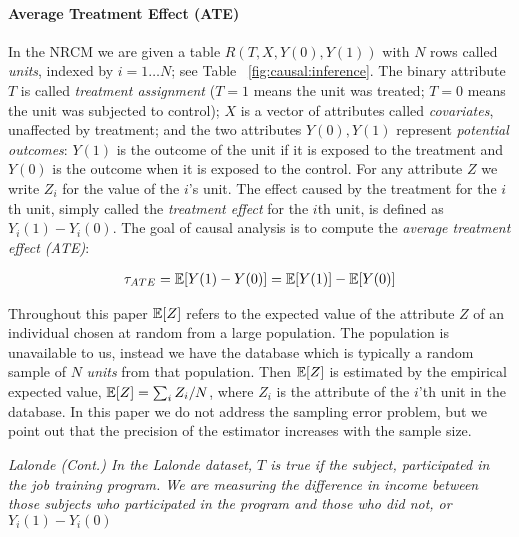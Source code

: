 \vspace{-.3cm}

\paragraph*{Average Treatment Effect (ATE)}
In the NRCM we are given a table $R(T,X,Y(0),Y(1))$ with $N$ rows called {\em units},
indexed by $i=1 \ldots N$; see Table~ \ref{fig:causal:inference}.
The binary attribute $T$ is called {\em treatment assignment}
($T=1$ means the unit was treated; $T=0$ means the unit was subjected to control);
$X$ is a vector of attributes called {\em covariates}, unaffected by treatment;
and the two attributes $Y(0), Y(1)$ represent {\em potential outcomes}:
$Y(1)$ is the outcome of the unit if it is exposed to the treatment and
$Y(0)$ is the outcome when it is exposed to the control.
For any attribute $Z$ we write $Z_i$ for the value of the $i$'s unit.
The effect caused by the treatment for the $i$th unit,
simply called the {\em treatment effect} for the $i$th unit, is defined as $Y_i(1)-Y_i(0)$.
The goal of causal analysis is to compute the {\em average treatment effect (ATE)}:


\vspace{-.4cm}
\begin{align}
  \ate = \E[Y(1)-Y(0)] = \E[Y(1)] - \E[Y(0)] \ignore{=\frac{1}{N} \sum_i (Y_i(1)-Y_i(0))}  \label{eq:ate}
\end{align}


Throughout this paper $\E[Z]$ refers to the expected value of the
attribute $Z$ of an individual chosen at random from a large
population.  The population is unavailable to us, instead we have the
database which is typically a random sample of $N$ {\em units} from
that population.  Then $\E[Z]$ is estimated by the empirical expected
value, $\E[Z] = \sum_i Z_i/N$, where $Z_i$ is the attribute of the
$i$'th unit in the database.  In this paper we do not address the
sampling error problem, but we point out that the precision of the
estimator increases with the sample size.  
\vspace{-.15cm}

\begin{example} \em \label{exa3} Lalonde (Cont.)
In the Lalonde dataset, $T$ is true if the subject, participated in the
job training program. We are measuring the difference in income between those subjects
who participated in the program and those who did not, or $Y_i(1)-Y_i(0)$
\end{example}

